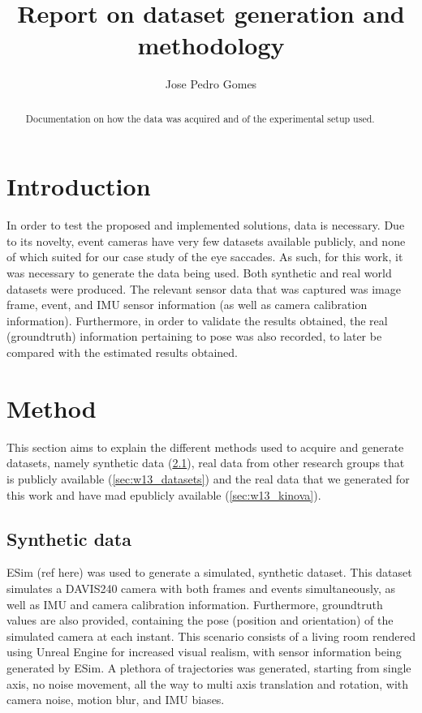 \documentclass[10pt,twocolumn]{IEEEtran}
\begin{document}
\title{Report on dataset generation and methodology}
\author{Jose Pedro Gomes}

\maketitle

\begin{abstract}
    Documentation on how the data was acquired and of the experimental setup used.
\end{abstract}

\section{Introduction}

In order to test the proposed and implemented solutions, data is necessary. Due to its novelty, event cameras have very few datasets available publicly, and none of which suited for our case study of the eye saccades. As such, for this work, it was necessary to generate the data being used. Both synthetic and real world datasets were produced. The relevant sensor data that was captured was image frame, event, and IMU sensor information (as well as camera calibration information). Furthermore, in order to validate the results obtained, the real (groundtruth) information pertaining to pose was also recorded, to later be compared with the estimated results obtained. 


\section{Method}

This section aims to explain the different methods used to acquire and generate datasets, namely synthetic data (\ref{sec:w13_synthetic}), real data from other research groups that is publicly available (\ref{sec:w13_datasets}) and the real data that we generated for this work and have mad epublicly available (\ref{sec:w13_kinova}). 

\subsection{Synthetic data}
\label{sec:w13_synthetic}

ESim (ref here) was used to generate a simulated, synthetic dataset. This dataset simulates a DAVIS240 camera with both frames and events simultaneously, as well as IMU and camera calibration information. Furthermore, groundtruth values are also provided, containing the pose (position and orientation) of the simulated camera at each instant. This scenario consists of a living room rendered using Unreal Engine for increased visual realism, with sensor information being generated by ESim. A plethora of trajectories was generated, starting from single axis, no noise movement, all the way to multi axis translation and rotation, with camera noise, motion blur, and IMU biases. 
\end{document}

